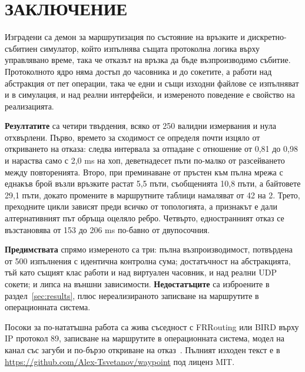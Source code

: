 \section*{ЗАКЛЮЧЕНИЕ}
\label{sec:conclusion}

Изградени са демон за маршрутизация по състояние на връзките и дискретно-събитиен симулатор,
който изпълнява същата протоколна логика върху управлявано време, така че отказът на връзка да
бъде възпроизводимо събитие. Протоколното ядро няма достъп до часовника и до сокетите, а работи
над абстракция от пет операции, така че едни и същи изходни файлове се изпълняват и в симулация,
и над реални интерфейси, и измереното поведение е свойство на реализацията.

\textbf{Резултатите} са четири твърдения, всяко от 250 валидни измервания и нула отхвърлени.
Първо, времето за сходимост се определя почти изцяло от откриването на отказа: следва интервала
за отпадане с отношение от 0,81 до 0,98 и нараства само с 2,0 ms на хоп, деветнадесет пъти
по-малко от разсейването между повторенията. Второ, при преминаване от пръстен към пълна мрежа
с еднакъв брой възли връзките растат 5,5 пъти, съобщенията 10,8 пъти, а байтовете
29,1 пъти,
докато промените в маршрутните таблици намаляват от 42 на 2. Трето, преходните цикли зависят
преди всичко от топологията, а признакът е дали алтернативният път обръща оцеляло ребро.
Четвърто, едностранният отказ се възстановява от 153 до 206 ms по-бавно от двупосочния.

\textbf{Предимствата} спрямо измереното са три: пълна възпроизводимост, потвърдена от 500
изпълнения с идентична контролна сума; достатъчност на абстракцията, тъй като същият клас
 работи и над виртуален часовник, и над реални UDP сокети; и липса на външни
зависимости. \textbf{Недостатъците} са изброените в раздел~\ref{sec:results}, плюс
нереализираното записване на маршрутите в операционната система.

Посоки за по-нататъшна работа са жива съседност с FRRouting или
BIRD върху IP протокол 89, записване на маршрутите в операционната система, модел на канал със
загуби и по-бързо откриване на отказ~\cite{rfc5880}. Пълният изходен текст е в \url{https://github.com/Alex-Tsvetanov/waypoint} под
лиценз MIT.
